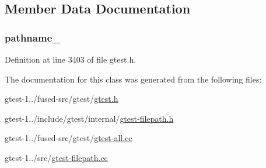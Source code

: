 \subsection{\-Member \-Data \-Documentation}
\hypertarget{classtesting_1_1internal_1_1FilePath_a1e4431b887c17bce0f4746ff2e54919c}{
\subsubsection[{pathname\-\_\-}]{ {\bf pathname\-\_\-}}}\label{de/dea/classtesting_1_1internal_1_1FilePath_a1e4431b887c17bce0f4746ff2e54919c}


\-Definition at line 3403 of file gtest.\-h.



\-The documentation for this class was generated from the following files\-:\begin{DoxyCompactItemize}
\item 
gtest-\/1../fused-\/src/gtest/\hyperlink{fused-src_2gtest_2gtest_8h}{gtest.\-h}\item 
gtest-\/1../include/gtest/internal/\hyperlink{gtest-filepath_8h}{gtest-\/filepath.\-h}\item 
gtest-\/1../fused-\/src/gtest/\hyperlink{fused-src_2gtest_2gtest-all_8cc}{gtest-\/all.\-cc}\item 
gtest-\/1../src/\hyperlink{gtest-filepath_8cc}{gtest-\/filepath.\-cc}\end{DoxyCompactItemize}
